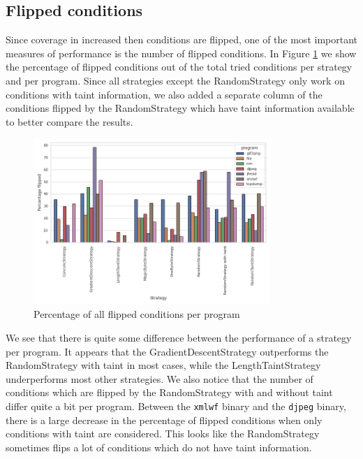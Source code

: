 \subsection{Flipped conditions}
Since coverage in increased then conditions are flipped, one of the most important measures of performance is the number of flipped conditions. In Figure \ref{fig:flipped-conditions} we show the percentage of flipped conditions out of the total tried conditions per strategy and per program. Since all strategies except the RandomStrategy only work on conditions with taint information, we also added a separate column of the conditions flipped by the RandomStrategy which have taint information available to better compare the results.

\begin{figure}[H]
    \centering
    \includegraphics[width=0.8\textwidth]{5_results/graphs_new/percentage_flipped_total.png}  
    \caption{Percentage of all flipped conditions per program}
    \label{fig:flipped-conditions}
\end{figure}

We see that there is quite some difference between the performance of a strategy per program. It appears that the GradientDescentStrategy outperforms the RandomStrategy with taint in most cases, while the LengthTaintStrategy underperforms most other strategies. We also notice that the number of conditions which are flipped by the RandomStrategy with and without taint differ quite a bit per program. Between the \texttt{xmlwf} binary and the \texttt{djpeg} binary, there is a large decrease in the percentage of flipped conditions when only conditions with taint are considered. This looks like the RandomStrategy sometimes flips a lot of conditions which do not have taint information.

